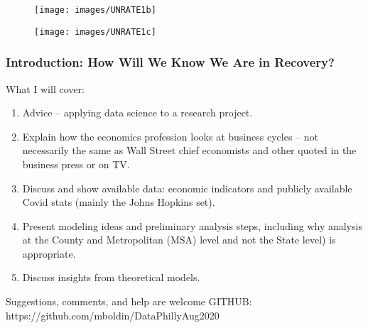 \documentclass{beamer}
\begin{document}
\begin{frame}
	
	\begin{figure}
		\centering
		\texttt{[image: images/UNRATE1b]}
	\end{figure}
	
\end{frame}

\begin{frame}
	
	\begin{figure}
		\centering
		\texttt{[image: images/UNRATE1c]}
	\end{figure}
	
\end{frame}

\begin{frame}
	\frametitle{Introduction: How Will We Know We Are in Recovery?}
	
	What I will cover:
	\begin{enumerate}
			\item Advice -- applying data science to a research project.  
			\item Explain how the economics profession looks at business cycles -- not necessarily the same as Wall Street chief economists and other quoted in the business press or on TV.
			\item Discuss  and show available data:  economic indicators and publicly available Covid stats (mainly the Johns Hopkins set).
			\item Present modeling ideas and  preliminary analysis steps, including why analysis at the County and Metropolitan (MSA) level and not the State level) is appropriate.	
			\item Discuss insights from theoretical models.		
	\end{enumerate}

Suggestions, comments, and help are welcome
GITHUB: https://github.com/mboldin/DataPhillyAug2020

\end{frame}
\end{document}

